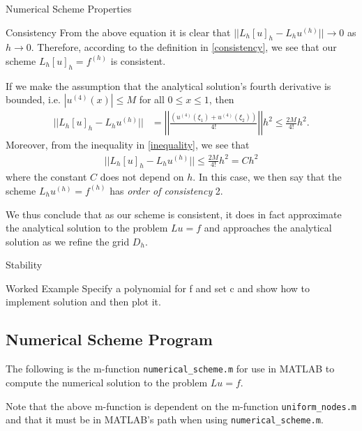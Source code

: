 \documentclass{article}
\begin{document}
\begin{section}{Numerical Scheme Properties}
\begin{subsection}{Consistency}
    From the above equation it is clear that $||L_h[u]_h - L_hu^{(h)}|| \to 0$ as $h \to 0$.
    Therefore, according to the definition in \eqref{consistency}, we see that
    our scheme $L_h[u]_h = f^{(h)}$ is consistent.

    If we make the assumption that the analytical solution's fourth derivative
    is bounded, i.e. $|u^{(4)}(x)| \leq M$ for all $0 \leq x \leq 1$, then
    \begin{align}\label{inequality}
      ||L_h[u]_h - L_hu^{(h)}||
      &= \left|\left| \frac{(u^{(4)}(\xi_1) + u^{(4)}(\xi_2))}{4!}\right|\right| h^2 \leq \frac{2M}{4!}h^2.
    \end{align}
    Moreover, from the inequality in \eqref{inequality}, we see that
    \begin{align}\label{order}
      ||L_h[u]_h - L_hu^{(h)}|| \leq \frac{2M}{4!}h^2 = Ch^2
    \end{align}
    where the constant $C$ does not depend on $h$. In this case, we then say that
    the scheme $L_h u^{(h)} = f^{(h)}$ has \textit{order of consistency} 2.

    We thus conclude that as our scheme is consistent, it does in fact approximate
    the analytical solution to the problem $Lu = f$ and approaches the analytical
    solution as we refine the grid $D_h$.
  \end{subsection}

  \begin{subsection}{Stability}
  \end{subsection}

\end{section}


\begin{section}{Worked Example}
  Specify a polynomial for f and set c and show how to implement solution and
  then plot it.
\end{section}


\newpage
\begin{appendices}
  \section{Numerical Scheme Program}
  The following is the m-function \texttt{numerical\_scheme.m} for use in MATLAB
  to compute the numerical solution to the problem $Lu = f$.
  

  Note that the above m-function is dependent on the m-function
  \texttt{uniform\_nodes.m} and that it must be in MATLAB's path when using
  \texttt{numerical\_scheme.m}.
  
\end{appendices}
\end{document}
